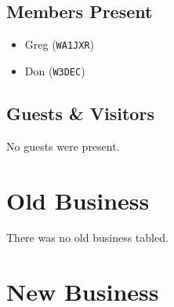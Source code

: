 \documentclass[10pt,letterpaper]{article}
\begin{document}
\subsection{Members Present}
\begin{itemize}
\item Greg (\texttt{WA1JXR})
\item Don (\texttt{W3DEC})
\end{itemize}

\subsection{Guests \& Visitors}

No guests were present.

\section{Old Business}

There was no old business tabled.

\section{New Business}
\end{document}
